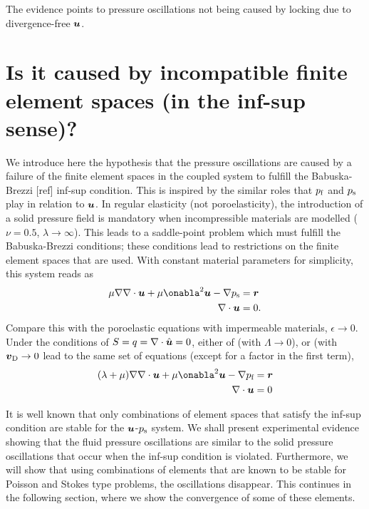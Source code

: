 
The evidence points to pressure oscillations not being caused by locking due to
divergence-free $\boldsymbol{u}$.

\section{Is it caused by incompatible finite element spaces (in the inf-sup sense)?}

We introduce here the hypothesis that the pressure oscillations are caused by a
failure of the finite element spaces in the coupled system to fulfill the
Babuska-Brezzi [ref] inf-sup condition.
This is inspired by the similar roles that $p_{\text{f}}$ and $p_{\text{s}}$ play in relation to
$\boldsymbol{u}$.
In regular elasticity (not poroelasticity), the introduction of a solid
pressure field is mandatory when incompressible materials are modelled
($\nu=0.5$, $\lambda\rightarrow\infty$).
This leads to a saddle-point problem which must fulfill the Babuska-Brezzi
conditions; these conditions lead to restrictions on the finite element spaces
that are used.
With constant material parameters for simplicity, this system reads as
\begin{align}
  \mu \nabla \nabla \cdot \U + \mu \onabla^2 \U - \nabla \Ps &= \V{r}\\
  \nabla \cdot \U &= 0.
\end{align}
Compare this with the poroelastic equations with impermeable materials,
$\epsilon\rightarrow 0$.
Under the conditions of $S=q=\nabla\cdot\hat{\boldsymbol{u}}=0$, either of
 (with $\Lambda\rightarrow 0$), or  (with
$\boldsymbol{v}_{\text{D}}\rightarrow 0$ lead to the same set of equations (except for a factor in
the first term),
\begin{align}
(\lambda+\mu) \nabla \nabla \cdot \U + \mu \onabla^2 \U - \nabla \Pf &= \V{r}\\
\nabla \cdot \U &= 0
\end{align}

It is well known that only combinations of element spaces that satisfy the
inf-sup condition are stable for the $\boldsymbol{u}$-$p_{\text{s}}$ system.
We shall present experimental evidence showing that the fluid pressure
oscillations are similar to the solid pressure oscillations that occur when the
inf-sup condition is violated.
Furthermore, we will show that using combinations of elements that are known to
be stable for Poisson and Stokes type problems, the oscillations disappear.
This continues in the following section, where we show the
convergence of some of these elements.

